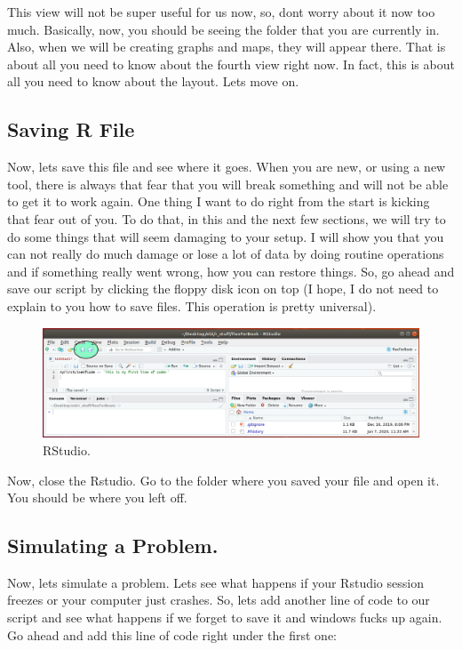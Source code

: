 \documentclass[]{book}
\begin{document}
This view will not be super useful for us now, so, dont worry about it now too much. Basically, now, you should be seeing the folder that you are currently in. Also, when we will be creating graphs and maps, they will appear there. That is about all you need to know about the fourth view right now. In fact, this is about all you need to know about the layout. Lets move on.

\hypertarget{saving-r-file}{%
\subsection{Saving R File}\label{saving-r-file}}

Now, lets save this file and see where it goes. When you are new, or using a new tool, there is always that fear that you will break something and will not be able to get it to work again. One thing I want to do right from the start is kicking that fear out of you. To do that, in this and the next few sections, we will try to do some things that will seem damaging to your setup. I will show you that you can not really do much damage or lose a lot of data by doing routine operations and if something really went wrong, how you can restore things. So, go ahead and save our script by clicking the floppy disk icon on top (I hope, I do not need to explain to you how to save files. This operation is pretty universal).

\begin{figure}
\centering
\includegraphics{rstudio7.png}
\caption{RStudio.}
\end{figure}

Now, close the Rstudio. Go to the folder where you saved your file and open it. You should be where you left off.

\hypertarget{simulating-a-problem.}{%
\subsection{Simulating a Problem.}\label{simulating-a-problem.}}

Now, lets simulate a problem. Lets see what happens if your Rstudio session freezes or your computer just crashes. So, lets add another line of code to our script and see what happens if we forget to save it and windows fucks up again. Go ahead and add this line of code right under the first one:
\end{document}
